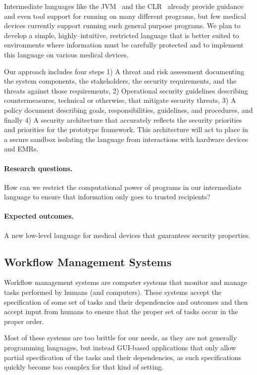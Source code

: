Intermediate languages like the JVM~\citep{jvm} and the CLR~\citep{clr}
already provide guidance and even tool support for running on many
different programs, but few medical devices currently support running
such general purpose programs. We plan to develop a simple, highly–intuitive,
restricted language that is better suited to environments where
information must be carefully protected and to implement this language on various medical devices.

Our approach includes four steps 1) A threat and risk assessment
documenting the system components, the stakeholders, the security
requirements, and the threats against those requirements, 2)
Operational security guidelines describing countermeasures, technical
or otherwise, that mitigate security threats, 3) A policy document
describing goals, responsibilities, guidelines, and procedures, and
finally 4) A security architecture that accurately reflects the
security priorities and priorities for the prototype framework.  This
architecture will act to place \poppl{} in a secure sandbox isolating
the language from interactions with hardware devices and EMRs.

\paragraph{Research questions.} How can we restrict the computational
power of programs in our intermediate language to ensure that
information only goes to trusted recipients? 

\paragraph{Expected outcomes.} A new low-level language for medical
devices that guarantees security properties.

\subsection{Workflow Management Systems}

Workflow management systems are computer systems that monitor and
manage tasks performed by humans (and computers). These systems accept
the specification of some set of tasks and their dependencies and
outcomes and then accept input from humans to ensure that the proper
set of tasks occur in the proper order.

Most of these systems are too brittle for our needs, as they are not
generally programming languages, but instead GUI-based applications
that only allow partial specification of the tasks and their
dependencies, as such specifications quickly become too complex for
that kind of setting.

